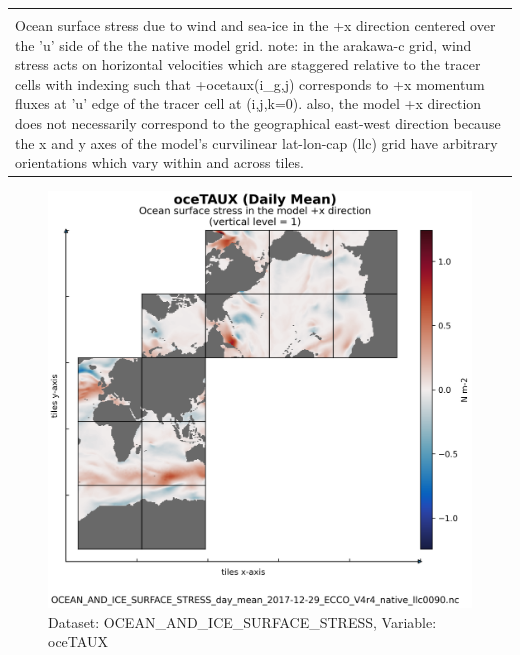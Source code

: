 \begin{longtable}{|m{}|m{}|m{}|m{}|}
{{{{{}}}}} \\ \hline
\rowcolor{lightgray} \multicolumn{4}{|c|}{\textbf{Comments}} \\ \hline
\multicolumn{4}{|p{1\textwidth}|}{\footnotesize{{Ocean surface stress due to wind and sea-ice in the +x direction centered over the 'u' side of the the native model grid. note: in the arakawa-c grid, wind stress acts on horizontal velocities which are staggered relative to the tracer cells with indexing such that +ocetaux(i\_g,j) corresponds to +x momentum fluxes at 'u' edge of the tracer cell at (i,j,k=0). also, the model +x direction does not necessarily correspond to the geographical east-west direction because the x and y axes of the model's curvilinear lat-lon-cap (llc) grid have arbitrary orientations which vary within and across tiles.}}} \\ \hline
\end{longtable}

\begin{figure}[H]
\centering
\includegraphics[scale=0.55]{../images/plots/native_plots/Ocean_and_Sea-Ice_Surface_Stress/oceTAUX.png}
\caption{Dataset: OCEAN\_AND\_ICE\_SURFACE\_STRESS, Variable: oceTAUX}
\label{tab:table-OCEAN_AND_ICE_SURFACE_STRESS_oceTAUX-Plot}
\end{figure}
\newpage
\pagebreak
